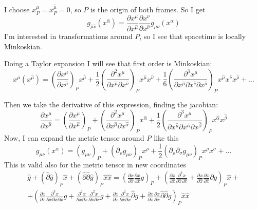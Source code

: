 I choose $x^{\mu }_{P}= x^{\hat{\mu }}_{P}=0$, so $P$ is the origin of both frames. So I get
\[
g_{\hat{\mu }\hat{\nu }}\left( x^{\hat{\alpha }} \right) = \frac{\partial x^{\mu }}{\partial x^{\hat{\mu }}} \frac{\partial x^{\nu }}{\partial x^{\hat{\nu }}} g_{\mu \nu }\left( x^{\alpha } \right) 
\]
I'm interested in transformations around $P$, so I see that spacetime is locally Minkoskian.\par
Doing a Taylor expansion I will see that first order is Minkoskian:
\begin{equation}
x^{\mu }\left( x^{\hat{\mu }} \right) = \left( \frac{\partial x^{\mu }}{\partial x^{\hat{\mu }}}  \right)_{P}x^{\hat{\mu }} + \frac{1}{2}\left( \frac{\partial^{2}x^{\mu }}{\partial x^{\hat{\mu }}\partial  x^{\hat{\nu }}}  \right)_{P}x^{\hat{\mu }}x^{\hat{\nu }}+ \frac{1}{6} \left( \frac{\partial^{3}x^{\mu }}{\partial x^{\hat{\mu }}\partial x^{\hat{\nu }}\partial x^{\hat{\rho }} }  \right)_{P} x^{\hat{\mu }}x^{\hat{\nu }}x^{\hat{\rho }}+ \ldots 
\end{equation}

Then we take the derivative of this expression, finding the jacobian:
\begin{equation}
\frac{\partial x^{\mu }}{\partial x^{\hat{\mu }}} = \left( \frac{\partial x^{\mu }}{\partial x^{\hat{\mu }}}  \right)_{P} + \left( \frac{\partial^{2}x^{\mu }}{\partial x^{\hat{\mu }}\partial x^{\hat{\alpha }} }  \right)_{P} x^{\hat{\alpha }} +\frac{1}{2} \left( \frac{\partial^{3}x^{\mu }}{\partial x^{\hat{\mu }}\partial x^{\hat{\alpha }} \partial x^{\hat{\beta  }}}  \right)_{P} x^{\hat{\alpha }}x^{\hat{\beta }}
\end{equation}
Now, I can expand the metric tensor around \emph{P} like this
\begin{equation}
g_{\mu \nu } \left( x^{\alpha } \right) = \left( g_{\mu \nu } \right)_{P} + \left( \partial_{\rho }g_{\mu \nu } \right)_{P} x^{\rho } +\frac{1}{2} \left( \partial_{\rho }\partial _{\sigma } g_{\mu \nu } \right)_{P} x^{\rho }x^{\sigma }+ \ldots 
\end{equation}
This is valid also for the metric tensor in new coordinates
\begin{gather*}
\hat{g} + \left( \hat{\partial }\hat{g} \right)_{P}\hat{x} + \left( \hat{\partial }\hat{\partial }\hat{g} \right)_{P}\hat{x}\hat{x}  = \left( \frac{\partial x}{\partial \hat{x}} \frac{\partial x}{\partial \hat{x}} g \right)_{P} + \left( \frac{\partial x}{\partial \hat{x}}  \frac{\partial^{2}x}{\partial \hat{x} \partial \hat{x}} + \frac{\partial x}{\partial \hat{x}} \frac{\partial x}{\partial \hat{x}} \partial g \right)_{P}\hat{x} + \\
+ \left( \frac{\partial x}{\partial \hat{x}} \frac{\partial^{3}x}{\partial \hat{x} \partial \hat{x} \partial \hat{x}} g + \frac{\partial^{2}x}{\partial \hat{x} \partial \hat{x}} \frac{\partial^{2}x}{\partial \hat{x} \partial \hat{x}} g + \frac{\partial x}{\partial \hat{x}} \frac{\partial^{2}x}{\partial \hat{x} \partial \hat{x}} \hat{\partial}g + \frac{\partial x}{\partial \hat{x}} \frac{\partial x}{\partial \hat{x}} \hat{\partial }\hat{\partial} g \right)_{P} \hat{x}\hat{x} 
\end{gather*}

